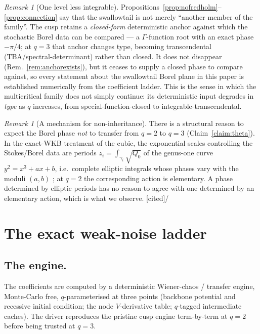 \documentclass[11pt,reqno]{amsart}
\theoremstyle{plain}
\theoremstyle{definition}
\theoremstyle{remark}
\newtheorem{remark}[theorem]{Remark}
\newcommand{\tagC}{{\footnotesize\textsf{[cited]}}}
\newcommand{\tagX}{{\footnotesize\textsf{[conjectural]}}}
\begin{document}
\begin{remark}[One level less integrable]\label{rem:lessintegrable}
Propositions~\ref{prop:nofredholm}--\ref{prop:connection} say that the swallowtail is not merely
``another member of the family''. The cusp retains a \emph{closed-form} deterministic anchor
against which the stochastic Borel data can be compared --- a $\Gamma$-function root with an exact
phase $-\pi/4$; at $q=3$ that anchor changes type, becoming transcendental (TBA/spectral-determinant)
rather than closed. It does not disappear (Rem.~\ref{rem:anchorexists}), but it ceases to supply a
closed phase to compare against, so every statement about the swallowtail Borel plane in this paper
is established numerically from the coefficient ladder. This is the sense in which the multicritical
family does not simply continue: its deterministic input degrades in \emph{type} as $q$ increases,
from special-function-closed to integrable-transcendental.
\end{remark}

\begin{remark}[A mechanism for non-inheritance]\label{rem:mechanism}
There is a structural reason to expect the Borel phase \emph{not} to transfer from $q=2$ to $q=3$
(Claim~\ref{claim:theta}). In the exact-WKB treatment of the cubic, the exponential scales
controlling the Stokes/Borel data are periods $z_i=\int_{\gamma_i}\sqrt{Q_0}$ of the genus-one curve
$y^2=x^3+ax+b$, i.e.\ complete elliptic integrals whose phases vary with the moduli $(a,b)$
\cite{AllegrettiBridgeland}; at $q=2$ the corresponding action is elementary. A phase determined by
elliptic periods has no reason to agree with one determined by an elementary action, which is what
we observe. \tagC\;/\;\tagX
\end{remark}

\section{The exact weak-noise ladder}\label{sec:ladder}

\subsection{The engine.}
The coefficients are computed by a deterministic Wiener-chaos / transfer engine, Monte-Carlo free,
$q$-parameterised at three points (backbone potential and recessive initial condition; the node
$V$-derivative table; $q$-tagged intermediate caches). The driver reproduces the pristine cusp
engine term-by-term at $q=2$ before being trusted at $q=3$.
\end{document}
